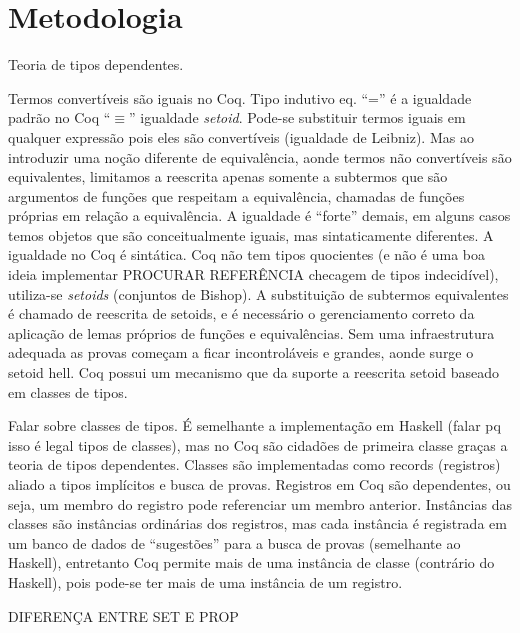 \chapter{Metodologia}\label{chp:metodologia}
Teoria de tipos dependentes.

Termos convertíveis são iguais no Coq. Tipo indutivo eq. ``='' é a igualdade padrão no Coq ``$\equiv$'' igualdade \textit{setoid}. Pode-se substituir termos iguais em qualquer expressão pois eles são convertíveis (igualdade de Leibniz).
Mas ao introduzir uma noção diferente de equivalência, aonde termos não convertíveis são equivalentes, limitamos a reescrita
apenas somente a subtermos que são argumentos de funções que respeitam a equivalência, chamadas de funções próprias em relação a equivalência. A igualdade é ``forte'' demais, em alguns casos temos objetos que são conceitualmente iguais, mas sintaticamente diferentes. A igualdade no Coq é sintática. Coq não tem tipos quocientes (e não é uma boa ideia implementar PROCURAR REFERÊNCIA checagem de tipos indecidível), utiliza-se \textit{setoids} (conjuntos de Bishop). A substituição de subtermos equivalentes é chamado de reescrita de setoids, e é necessário o gerenciamento correto da aplicação de lemas próprios de funções e equivalências. Sem uma infraestrutura adequada as provas começam a ficar incontroláveis e grandes, aonde surge o setoid hell. Coq possui um mecanismo que da suporte a reescrita setoid baseado em classes de tipos.


Falar sobre classes de tipos. É semelhante a implementação em Haskell (falar pq isso é legal tipos de classes), mas no Coq são cidadões de primeira classe graças a teoria de tipos dependentes. Classes são implementadas como records (registros) aliado a tipos implícitos e busca de provas. Registros em Coq são dependentes, ou seja, um membro do registro pode referenciar um membro anterior. Instâncias das classes são instâncias ordinárias dos registros, mas cada instância é registrada em um banco de dados de ``sugestões'' para a busca de provas (semelhante ao Haskell), entretanto Coq permite mais de uma instância de classe (contrário do Haskell), pois pode-se ter mais de uma instância de um registro.

DIFERENÇA ENTRE SET E PROP